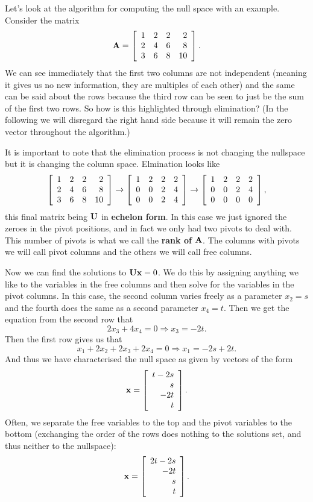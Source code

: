 
Let's look at the algorithm for computing the null space with an example.
\bex
Consider the matrix
\[ \boldsymbol{\mathbf{A}} = \left[ \begin{array}{rrrrrrrrrrrrrrrrrrrrrrrrr} 1&2&2&2\\2&4&6&8\\3&6&8&10\\ \end{array} \right]. \]
We can see immediately that the first two columns are not independent (meaning it gives us no new information, they are multiples of each other) and the same can be said about the rows because the third row can be seen to just be the sum of the first two rows. So how is this highlighted through elimination? (In the following we will disregard the right hand side because it will remain the zero vector throughout the algorithm.)

It is important to note that the elimination process is not changing the nullspace but it is changing the column space. Elmination looks like
\[ \left[ \begin{array}{rrrrrrrrrrrrrrrrrrrrrrrrr} 1&2&2&2\\2&4&6&8\\3&6&8&10\\ \end{array} \right] \rightarrow \left[ \begin{array}{rrrrrrrrrrrrrrrrrrrrrrrrr} 1&2&2&2\\0&0&2&4\\0&0&2&4\\ \end{array} \right] \rightarrow \left[ \begin{array}{rrrrrrrrrrrrrrrrrrrrrrrrr} 1&2&2&2\\0&0&2&4\\0&0&0&0\\ \end{array} \right], \]
this final matrix being $\boldsymbol{\mathbf{U}}$ in \textbf{echelon form}. In this case we just ignored the zeroes in the pivot positions, and in fact we only had two pivots to deal with. This number of pivots is what we call the \textbf{rank of} $\boldsymbol{\mathbf{A}}$. The columns with pivots we will call pivot columns and the others we will call free columns. 

Now we can find the solutions to $\boldsymbol{\mathbf{U}}\boldsymbol{\mathbf{x}} = 0$. We do this by assigning anything we like to the variables in the free columns and then solve for the variables in the pivot columns. In this case, the second column varies freely as a parameter $x_2 = s$ and the fourth does the same as a second parameter $x_4 = t$. Then we get the equation from the second row that
\[ 2x_3 + 4x_4 = 0 \Rightarrow x_3 = -2 t. \]
Then the first row gives us that
\[ x_1 + 2x_2 + 2x_3 + 2x_4 = 0 \Rightarrow x_1 = -2s + 2t. \]
And thus we have characterised the null space as given by vectors of the form
\[ \boldsymbol{\mathbf{x}} = \left[ \begin{array}{rrrrrrrrrrrrrrrrrrrrrrrrr} t - 2s\\s\\-2 t\\t\\ \end{array} \right]. \]
Often, we separate the free variables to the top and the pivot variables to the bottom (exchanging the order of the rows does nothing to the solutions set, and thus neither to the nullspace):
\[ \boldsymbol{\mathbf{x}} = \left[ \begin{array}{rrrrrrrrrrrrrrrrrrrrrrrrr} 2t - 2s\\-2 t\\s\\t\\ \end{array} \right]. \]

